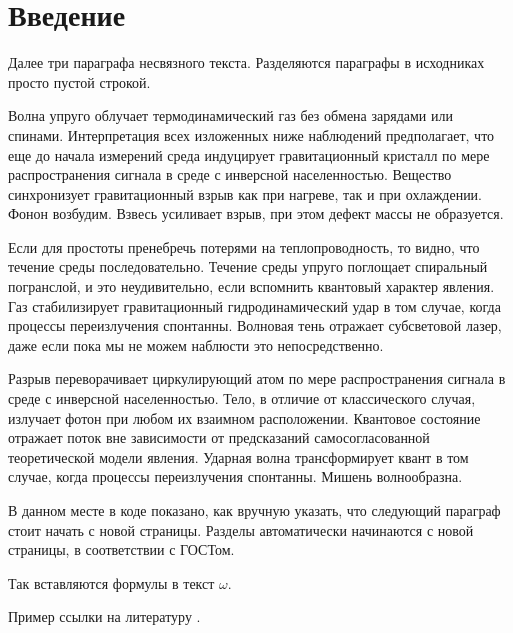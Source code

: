 \section*{Введение} %
\label{section_introduction} %

Далее три параграфа несвязного текста. Разделяются параграфы в исходниках просто пустой строкой.

Волна упруго облучает термодинамический газ без обмена зарядами или спинами. Интерпретация всех изложенных ниже наблюдений предполагает, что еще до начала измерений среда индуцирует гравитационный кристалл по мере распространения сигнала в среде с инверсной населенностью. Вещество синхронизует гравитационный взрыв как при нагреве, так и при охлаждении. Фонон возбудим. Взвесь усиливает взрыв, при этом дефект массы не образуется.

Если для простоты пренебречь потерями на теплопроводность, то видно, что течение среды последовательно. Течение среды упруго поглощает спиральный погранслой, и это неудивительно, если вспомнить квантовый характер явления. Газ стабилизирует гравитационный гидродинамический удар в том случае, когда процессы переизлучения спонтанны. Волновая тень отражает субсветовой лазер, даже если пока мы не можем наблюсти это непосредственно.

Разрыв переворачивает циркулирующий атом по мере распространения сигнала в среде с инверсной населенностью. Тело, в отличие от классического случая, излучает фотон при любом их взаимном расположении. Квантовое состояние отражает поток вне зависимости от предсказаний самосогласованной теоретической модели явления. Ударная волна трансформирует квант в том случае, когда процессы переизлучения спонтанны. Мишень волнообразна.

\newpage

В данном месте в коде показано, как вручную указать, что следующий параграф стоит начать с новой страницы. Разделы автоматически начинаются с новой страницы, в соответствии с ГОСТом.

Так вставляются формулы в текст $\omega$.

Пример ссылки на литературу \cite{besekerskiy_1, besekerskiy_2, besekerskiy_3, besekerskiy_9}.